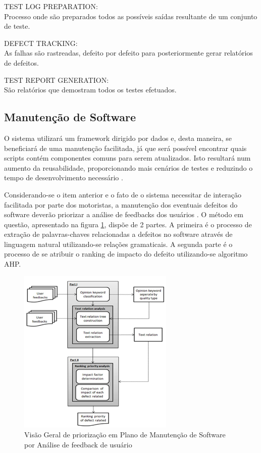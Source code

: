 \documentclass[12pt]{article}
\begin{document}
TEST LOG PREPARATION: \\
Processo onde são preparados todos as possíveis saídas resultante de um conjunto de teste.

DEFECT TRACKING: \\
As falhas são rastreadas, defeito por defeito para posteriormente gerar relatórios de defeitos.

TEST REPORT GENERATION: \\
São relatórios que demostram todos os testes efetuados.


\subsection{Manutenção de Software}

O sistema utilizará um framework dirigido por dados e, desta maneira, se beneficiará de uma manutenção facilitada, já que será possível encontrar quais scripts contém componentes comuns para serem atualizados. Isto resultará num aumento da reusabilidade, proporcionando mais cenários de testes e reduzindo o tempo de desenvolvimento necessário \cite{Patil2016}.

Considerando-se o item anterior e o fato de o sistema necessitar de interação facilitada por parte dos motoristas, a manutenção dos eventuais defeitos do software deverão priorizar a análise de feedbacks dos usuários \cite{Srewuttanapitikul2016}. O método em questão, apresentado na figura \ref{fig:exampleFig2}, dispõe de 2 partes. A primeira é o processo de extração de palavras-chaves relacionadas a defeitos no software através de linguagem natural utilizando-se relações gramaticais. A segunda parte é o processo de se atribuir o ranking de impacto do defeito utilizando-se algoritmo AHP.


\begin{figure}[ht]
\includegraphics[scale=.8, center] {swebok_manutencao.png}
\caption{Visão Geral de priorização em Plano de Manutenção de Software por Análise de feedback de usuário}
\label{fig:exampleFig2}
\end{figure}
\end{document}
